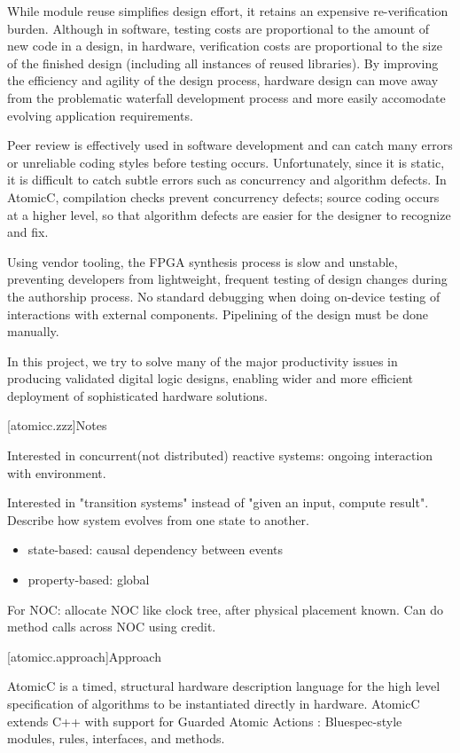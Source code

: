 While module reuse simplifies design effort, it retains
an expensive re-verification burden.  
Although in software, testing costs are proportional to the amount of new code in a design,
in hardware, verification costs are proportional to the size of the finished design (including
all instances of reused libraries).
By improving the efficiency and agility of the design
process, hardware design can move away from the problematic waterfall development
process and more easily accomodate evolving application requirements.

Peer review is effectively used in software development and can catch many errors
or unreliable coding styles before testing occurs.  Unfortunately, since it is
static, it is difficult to catch subtle errors such as concurrency and algorithm defects.
In AtomicC, compilation checks prevent concurrency defects; source coding occurs at a
higher level, so that algorithm defects are easier for the designer to recognize and fix.

Using vendor tooling,
the FPGA synthesis process is slow and unstable, preventing developers
from lightweight, frequent testing of design changes during the
authorship process.
No standard debugging when doing on-device testing of interactions
with external components.
Pipelining of the design must be done manually.

In this project, we try to solve many of the major
productivity issues in producing validated digital logic designs,
enabling wider and more efficient deployment of sophisticated
hardware solutions.

[atomicc.zzz]{Notes}

Interested in concurrent(not distributed) reactive systems: ongoing interaction
with environment.

Interested in "transition systems" instead of "given an input, compute result".
Describe how system evolves from one state to another.

\begin{itemize}
\item state-based: causal dependency between events
\item property-based: global
\end{itemize}

For NOC: allocate NOC like clock tree, after physical placement known.  Can do 
method calls across NOC using credit.

[atomicc.approach]{Approach}

AtomicC is a timed, structural hardware description language for
the high level specification of algorithms to be instantiated
directly in hardware.
AtomicC extends C++
with support for Guarded Atomic Actions
\cite{Hoe:Thesis,HoeArvind:TRSSynthesis2,Dave2007}:
Bluespec-style\cite{Bluespec:www}
modules, rules, interfaces, and methods.

